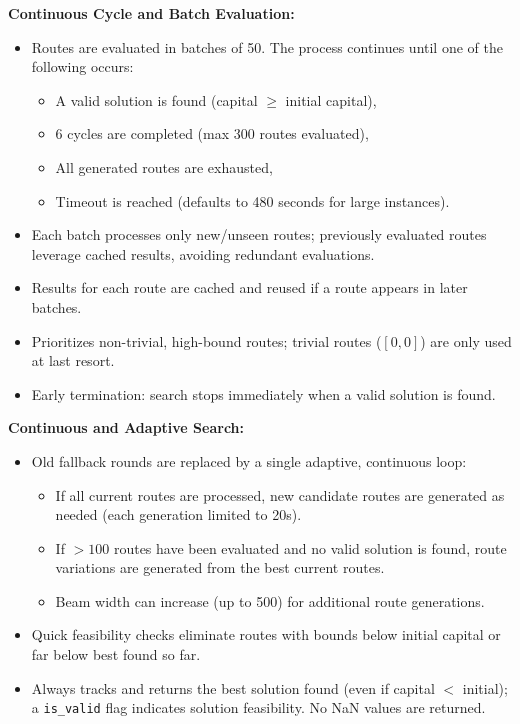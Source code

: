 \documentclass[12pt]{article}
\begin{document}
\textbf{Continuous Cycle and Batch Evaluation:}
\begin{itemize}
    \item Routes are evaluated in batches of 50. The process continues until one of the following occurs:
        \begin{itemize}
            \item A valid solution is found (capital $\geq$ initial capital),
            \item 6 cycles are completed (max 300 routes evaluated),
            \item All generated routes are exhausted,
            \item Timeout is reached (defaults to 480 seconds for large instances).
        \end{itemize}
    \item Each batch processes only new/unseen routes; previously evaluated routes leverage cached results, avoiding redundant evaluations.
    \item Results for each route are cached and reused if a route appears in later batches.
    \item Prioritizes non-trivial, high-bound routes; trivial routes ($[0,0]$) are only used at last resort.
    \item Early termination: search stops immediately when a valid solution is found.
\end{itemize}

\textbf{Continuous and Adaptive Search:}
\begin{itemize}
    \item Old fallback rounds are replaced by a single adaptive, continuous loop:
        \begin{itemize}
            \item If all current routes are processed, new candidate routes are generated as needed (each generation limited to 20s).
            \item If $>100$ routes have been evaluated and no valid solution is found, route variations are generated from the best current routes.
            \item Beam width can increase (up to 500) for additional route generations.
        \end{itemize}
    \item Quick feasibility checks eliminate routes with bounds below initial capital or far below best found so far.
    \item Always tracks and returns the best solution found (even if capital $<$ initial); a \texttt{is\_valid} flag indicates solution feasibility. No NaN values are returned.
\end{itemize}
\end{document}
